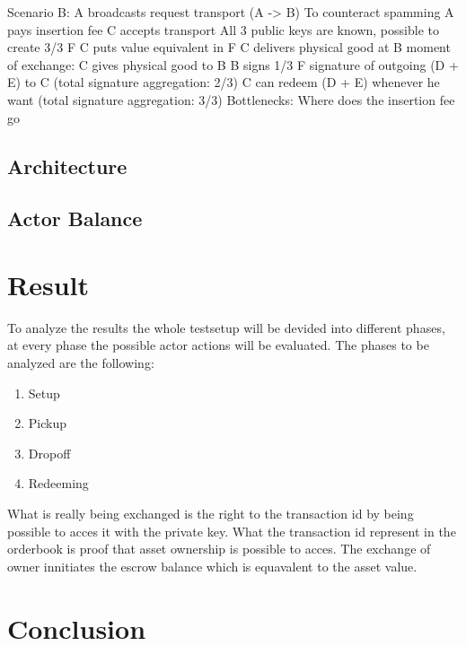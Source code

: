 \documentclass[Nomencl]{DylanMaster}
\begin{document}
Scenario B:
A broadcasts request transport (A -> B)
To counteract spamming
A pays insertion fee
C accepts transport
All 3 public keys are known, possible to create 3/3 F
C puts value equivalent in F
C delivers physical good at B
moment of exchange:
C gives physical good to B
B signs 1/3 F signature of outgoing (D + E) to C (total signature aggregation: 2/3)
C can redeem (D + E) whenever he want (total signature aggregation: 3/3)
Bottlenecks:
Where does the insertion fee go

\subsection{Architecture}

\subsection{Actor Balance}


\section{Result}

To analyze the results the whole testsetup will be devided into different phases, at every phase the possible actor actions will be evaluated. The phases to be analyzed are the following:
\begin{enumerate}
  \item Setup
  \item Pickup
  \item Dropoff
  \item Redeeming
\end{enumerate}

What is really being exchanged is the right to the transaction id by being possible to acces it with the private key. What the transaction id represent in the orderbook is proof that asset ownership is possible to acces. The exchange of owner innitiates the escrow balance which is equavalent to the asset value.

\section{Conclusion}
\end{document}

